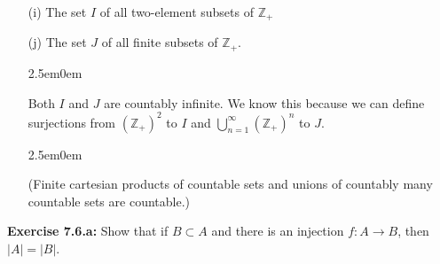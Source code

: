 \documentclass{book}
\newcommand{\exTwo}{%
\color{Purple}%
   \fontsize{13}{15}\selectfont%
}
\newenvironment{myIndent}{%
   \begin{adjustwidth}{2.5em}{0em}%
}{%
   \end{adjustwidth}%
}
\newcommand{\blab}[1]{\textbf{#1}}
\newcommand{\retTwo}{\hfill\bigbreak}
\begin{document}
\begin{itemize}
      \item[(i)] The set $I$ of all two-element subsets of $\mathbb{Z}_+$
      \item[(j)] The set $J$ of all finite subsets of $\mathbb{Z}_+$.
      
      \begin{myIndent}\exTwo
         Both $I$ and $J$ are countably infinite. We know this because we can define\\ surjections from $(\mathbb{Z_+})^2$ to $I$ and $\bigcup\limits_{n = 1}^\infty (\mathbb{Z}_+)^n$ to $J$.
         
         \begin{myIndent}
            (Finite cartesian products of countable sets and unions of countably many countable sets are countable.)\retTwo\retTwo
         \end{myIndent}
      \end{myIndent}
   \end{itemize}

   \blab{Exercise 7.6.a:} Show that if $B \subset A$ and there is an injection $f: A \longrightarrow B$, then $|A| = |B|$.
\end{document}
